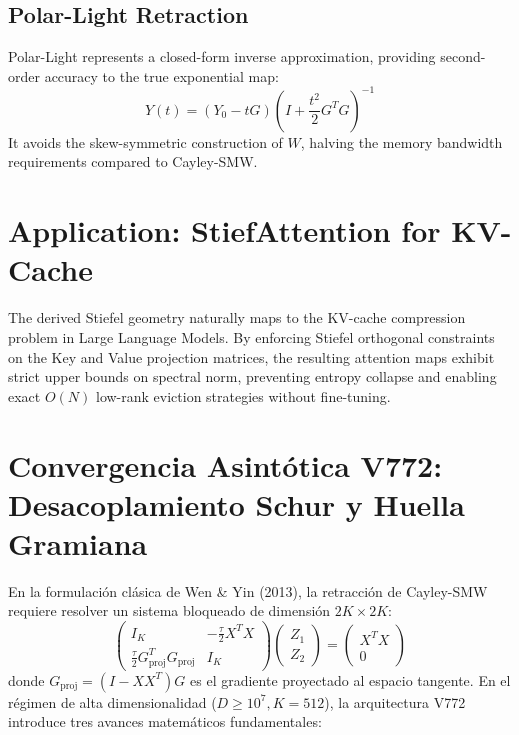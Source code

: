 \subsection{Polar-Light Retraction}
Polar-Light represents a closed-form inverse approximation, providing second-order accuracy to the true exponential map:
\begin{equation}
Y(t) = (Y_0 - t G) \left( I + \frac{t^2}{2} G^T G \right)^{-1}
\end{equation}
It avoids the skew-symmetric construction of $W$, halving the memory bandwidth requirements compared to Cayley-SMW.

\section{Application: StiefAttention for KV-Cache}

The derived Stiefel geometry naturally maps to the KV-cache compression problem in Large Language Models. By enforcing Stiefel orthogonal constraints on the Key and Value projection matrices, the resulting attention maps exhibit strict upper bounds on spectral norm, preventing entropy collapse and enabling exact $O(N)$ low-rank eviction strategies without fine-tuning.

\section{Convergencia Asintótica V772: Desacoplamiento Schur y Huella Gramiana}
\label{sec:cayley_v772_schur}

En la formulación clásica de Wen \& Yin (2013), la retracción de Cayley-SMW requiere resolver un sistema bloqueado de dimensión $2K \times 2K$:
\begin{equation}
\begin{pmatrix} I_K & -\frac{\tau}{2} X^T X \\ \frac{\tau}{2} G_{\text{proj}}^T G_{\text{proj}} & I_K \end{pmatrix} 
\begin{pmatrix} Z_1 \\ Z_2 \end{pmatrix} = \begin{pmatrix} X^T X \\ 0 \end{pmatrix}
\label{eq:wen_yin_block}
\end{equation}
donde $G_{\text{proj}} = (I - X X^T) G$ es el gradiente proyectado al espacio tangente. En el régimen de alta dimensionalidad ($D \ge 10^7, K = 512$), la arquitectura V772 introduce tres avances matemáticos fundamentales:

